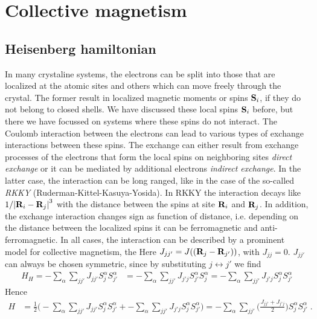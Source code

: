 \section{Collective magnetism }

\subsection{Heisenberg hamiltonian}
In many crystaline  systems, the electrons can be split into those that are localized at the atomic sites and others which can move freely through the crystal. The former result in localized
magnetic moments or spins $\mathbf S_{i}$, if they do not belong to closed shells. 
We have discussed these  local spins $\mathbf S_{i}$ before, but there we have focussed on systems where these spins do not interact. 
The Coulomb interaction between the electrons can lead to various types of exchange interactions
between these spins. The exchange can either result from exchange processes of the electrons that form the local spins on neighboring sites {\em direct exchange} or it can be mediated by
additional electrons {\em indirect exchange}. In the latter case, the interaction can be long ranged, like in the case of the so-called {\em RKKY} (Ruderman-Kittel-Kasuya-Yosida). 
In RKKY the interaction decays like $1/\abs{\mathbf R_{i}-\mathbf R_{j}}^{3}$ with the distance between the spins at site 
$\mathbf R_{i}$ and $\mathbf R_{j}$. In addition, the exchange interaction  changes sign as function of distance, i.e.
depending on the distance between the localized spins it can be ferromagnetic and anti-ferromagnetic. In all cases, the interaction can be described by a prominent model for collective magnetism, the 
Here $J_{jj'} = J((\mathbf R_{j}-\mathbf R_{j'}))$, with $J_{jj}=0$.
 $J_{jj'}$ can always be chosen symmetric, since by substituting $j\leftrightarrow j'$ we find
%
\begin{align*}
H_{H}= -\sum_{\alpha}\sum_{jj'} J_{jj'} S^{\alpha}_{j}S^{\alpha}_{j'} &= -\sum_{\alpha}\sum_{jj'} J_{j'j} S^{\alpha}_{j'}S^{\alpha}_{j} =-\sum_{\alpha}\sum_{jj'} J_{j'j} S^{\alpha}_{j}S^{\alpha}_{j'} 
\end{align*}
%
Hence 
%
\begin{align*}
H &= \frac{1}{2}\bigg(  -\sum_{\alpha}\sum_{jj'} J_{jj'} S^{\alpha}_{j}S^{\alpha}_{j'} 
+ -\sum_{\alpha}\sum_{jj'} J_{j'j} S^{\alpha}_{j}S^{\alpha}_{j'}  \bigg)=
 -\sum_{\alpha}\sum_{jj'} \big(\frac{J_{jj'}+J_{j'j}}{2}\big) S^{\alpha}_{j}S^{\alpha}_{j'} \;.
\end{align*}
